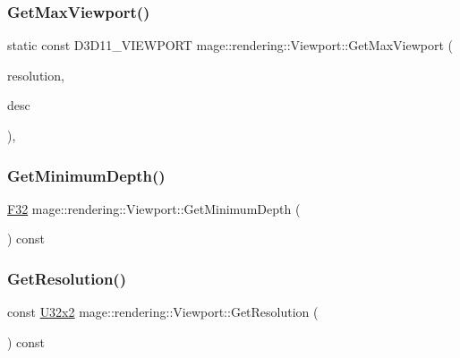 \subsubsection{\texorpdfstring{Get\+Max\+Viewport()}{GetMaxViewport()}\hspace{0.1cm}{\footnotesize\ttfamily [2/2]}}
{\footnotesize\ttfamily static const D3\+D11\+\_\+\+V\+I\+E\+W\+P\+O\+RT mage\+::rendering\+::\+Viewport\+::\+Get\+Max\+Viewport (\begin{DoxyParamCaption}\item[{const \hyperlink{namespacemage_a88e05bff0300120c013285d3dcad95c5}{U32x2} \&}]{resolution,  }\item[{\hyperlink{namespacemage_1_1rendering_a25c189fd1da946d7a8f0abdd4f0e6afa}{A\+A\+Descriptor}}]{desc }\end{DoxyParamCaption})\hspace{0.3cm}{\ttfamily [static]}, {\ttfamily [noexcept]}}

\hypertarget{classmage_1_1rendering_1_1_viewport_ace36e941f271c9455a9d947b124d45da}{}\label{classmage_1_1rendering_1_1_viewport_ace36e941f271c9455a9d947b124d45da} 
\subsubsection{\texorpdfstring{Get\+Minimum\+Depth()}{GetMinimumDepth()}}
{\footnotesize\ttfamily \hyperlink{namespacemage_aa97e833b45f06d60a0a9c4fc22ae02c0}{F32} mage\+::rendering\+::\+Viewport\+::\+Get\+Minimum\+Depth (\begin{DoxyParamCaption}{ }\end{DoxyParamCaption}) const\hspace{0.3cm}{\ttfamily [noexcept]}}

\hypertarget{classmage_1_1rendering_1_1_viewport_aed4861d214f2c1e62d84fd4c81b6aa13}{}\label{classmage_1_1rendering_1_1_viewport_aed4861d214f2c1e62d84fd4c81b6aa13} 
\subsubsection{\texorpdfstring{Get\+Resolution()}{GetResolution()}}
{\footnotesize\ttfamily const \hyperlink{namespacemage_a88e05bff0300120c013285d3dcad95c5}{U32x2} mage\+::rendering\+::\+Viewport\+::\+Get\+Resolution (\begin{DoxyParamCaption}{ }\end{DoxyParamCaption}) const\hspace{0.3cm}{\ttfamily [noexcept]}}

